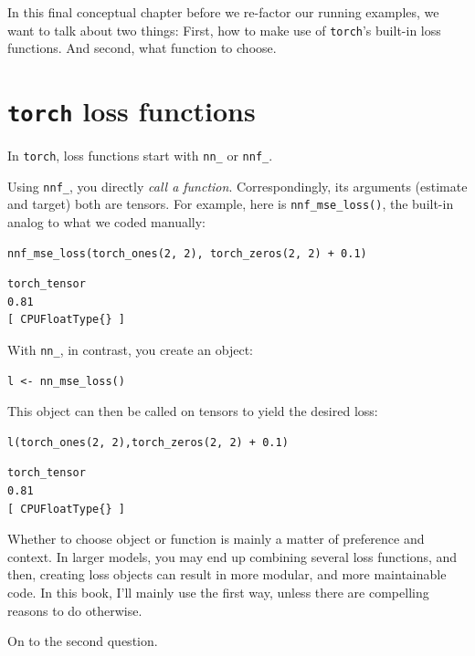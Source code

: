 \documentclass[
  letterpaper,
]{krantz}
\begin{document}
In this final conceptual chapter before we re-factor our running
examples, we want to talk about two things: First, how to make use of
\texttt{torch}'s built-in loss
functions. And second, what
function to choose.

\hypertarget{torch-loss-functions}{%
\section{\texorpdfstring{\texttt{torch} loss
functions}{torch loss functions}}\label{torch-loss-functions}}

In \texttt{torch}, loss functions start with \texttt{nn\_} or
\texttt{nnf\_}.

Using \texttt{nnf\_}, you directly \emph{call a function}.
Correspondingly, its arguments (estimate and target) both are tensors.
For example, here is \texttt{nnf\_mse\_loss()}, the built-in analog to
what we coded manually:

\begin{verbatim}
nnf_mse_loss(torch_ones(2, 2), torch_zeros(2, 2) + 0.1)
\end{verbatim}

\begin{verbatim}
torch_tensor
0.81
[ CPUFloatType{} ]
\end{verbatim}

With \texttt{nn\_}, in contrast, you create an object:

\begin{verbatim}
l <- nn_mse_loss()
\end{verbatim}

This object can then be called on tensors to yield the desired loss:

\begin{verbatim}
l(torch_ones(2, 2),torch_zeros(2, 2) + 0.1)
\end{verbatim}

\begin{verbatim}
torch_tensor
0.81
[ CPUFloatType{} ]
\end{verbatim}

Whether to choose object or function is mainly a matter of preference
and context. In larger models, you may end up combining several loss
functions, and then, creating loss objects can result in more modular,
and more maintainable code. In this book, I'll mainly use the first way,
unless there are compelling reasons to do otherwise.

On to the second question.
\end{document}
